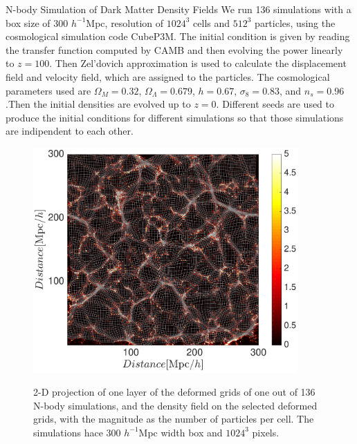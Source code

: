 \begin{section}{N-body Simulation of Dark Matter Density Fields}
  \label{sec:simulation}
    We run 136 simulations with a box size of 300 $h^{-1}$Mpc, 
resolution of $1024^3$ cells and $512^3$ particles, using the cosmological 
simulation code CubeP3M\cite{bib:Harnois2013}. The initial condition is 
given by reading the transfer function computed by CAMB \cite{bib:Lewis2000} 
and then evolving the power linearly to $z=100$. Then Zel'dovich approximation 
is used to calculate the displacement field and velocity field, which are 
assigned to the particles. The cosmological parameters used are $\Omega_M=0.32$, 
$\Omega_{\Lambda}=0.679$, $h=0.67$, $\sigma_8=0.83$, and $n_s=0.96$.Then the 
initial densities are evolved up to $z=0$. Different seeds are used to produce 
the initial conditions for different simulations so that those simulations are 
indipendent to each other.
\begin{figure}[t!]
\centering
 \includegraphics[width=0.9\textwidth]{sar_analysis-crop.pdf}
 \label{fig:simandrec}
   \caption{
2-D projection of one
layer of the deformed grids of one out of 136 N-body simulations, and the density field 
on the selected deformed grids, with the magnitude as the number of particles per cell. 
The simulations hace 300 $h^{-1}$Mpc width box and $1024^3$ pixels.}
\end{figure}

\end{section}


